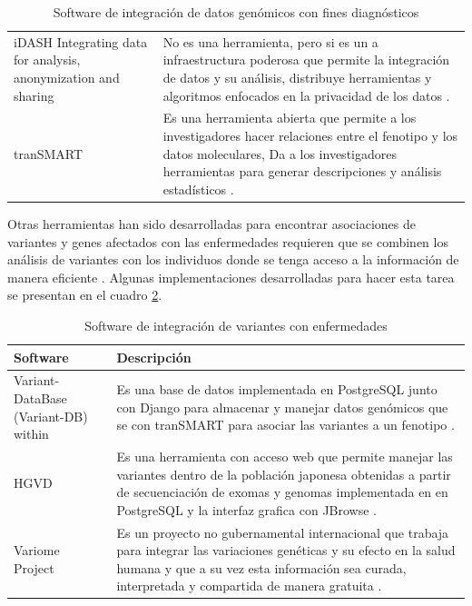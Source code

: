 \begin{table}[h!]
\begin{tabular}{|p{5cm}|p{10cm}|}
		iDASH Integrating data for analysis, anonymization and sharing & No es una herramienta, pero si es un a infraestructura poderosa que permite la integración de datos y su análisis, distribuye herramientas y algoritmos enfocados en la privacidad de los datos \cite{Canuel2015}. \\ \cline{1-2}
		
		tranSMART & Es una herramienta abierta que permite a los investigadores hacer relaciones entre el fenotipo y los datos moleculares, Da a los investigadores herramientas para generar descripciones y análisis estadísticos \cite{Canuel2015}. \\ \hline 
	\end{tabular}
			\caption{Software de integración de datos genómicos con fines diagnósticos}	
			\label{tabla}
\end{table}

Otras herramientas han sido desarrolladas para encontrar asociaciones de variantes y genes afectados con las enfermedades requieren que se combinen los análisis de variantes con los individuos donde se tenga acceso a la información de manera eficiente \cite{Kutzera2017}. Algunas implementaciones desarrolladas para hacer esta tarea se presentan en el cuadro \ref{r1}.

\begin{table}[]
	\centering
	\begin{tabular}{|p{5cm}|p{10cm}|}
		\hline
		Software     & Descripción                                                                                                                                                                                                                                                                                                                                                                     \\ \hline
		Variant-DataBase (Variant-DB) within      & Es una base de datos implementada en PostgreSQL junto con Django para almacenar y manejar datos genómicos que se con tranSMART para asociar las variantes a un fenotipo \cite{Kutzera2017}.      \\ \cline{1-2}
		HGVD       & Es una herramienta con acceso web que permite manejar las variantes dentro de la población japonesa obtenidas a partir de secuenciación de exomas y genomas implementada en en PostgreSQL y la interfaz grafica con JBrowse \cite{Higasa2016}.       \\ \cline{1-2}
		Variome Project    &   Es un proyecto no gubernamental internacional que trabaja para integrar las variaciones genéticas y su efecto en la salud humana y que a su vez esta información sea curada, interpretada y compartida de manera gratuita \cite{variome2017}.                                                                                                                                                                                                              \\ \hline
	\end{tabular}
        \caption{Software de integración de variantes con enfermedades}
		\label{r1}
\end{table}


